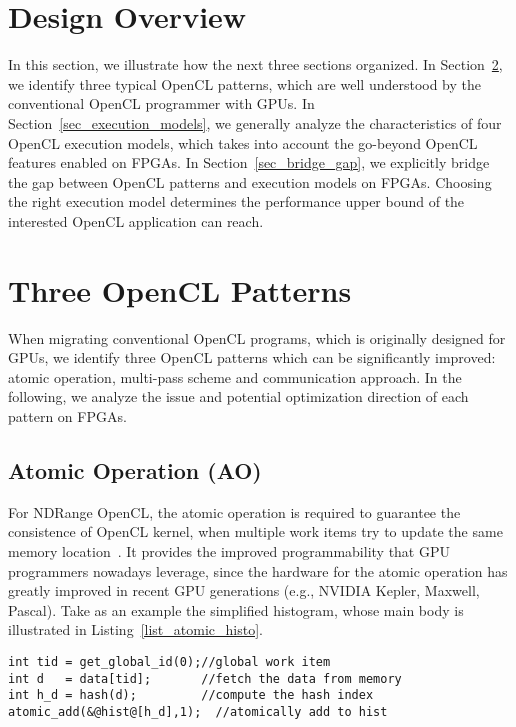 \section{Design Overview}
In this section, we illustrate how the next three sections organized. 
In Section~\ref{sec_patterns}, we identify three typical OpenCL patterns, which are well understood by the conventional OpenCL programmer with GPUs.
In Section~\ref{sec_execution_models}, we generally analyze the characteristics of four OpenCL execution models, which takes into account the go-beyond OpenCL features enabled on FPGAs.
In Section~\ref{sec_bridge_gap}, we explicitly bridge the gap between OpenCL patterns and execution models on FPGAs. Choosing the right execution model determines the performance upper bound of the interested OpenCL application can reach. %
\vspace{-1ex}
\section{Three OpenCL Patterns}%
\label{sec_patterns}
When migrating conventional OpenCL programs, which is originally designed for GPUs, we identify three OpenCL patterns which can be significantly improved: atomic operation, multi-pass scheme and communication approach. In the following, we analyze the issue and potential optimization direction of each pattern on FPGAs.

\vspace{-1ex}
\subsection{Atomic Operation (AO)}
For NDRange OpenCL, the atomic operation is required to guarantee the consistence of OpenCL kernel, when multiple work items try to update the same memory location~\cite{opencl_spec, atomic_fpga16}. It provides the improved programmability that GPU programmers nowadays leverage, since the hardware for the atomic operation has greatly improved in recent GPU generations (e.g., NVIDIA Kepler, Maxwell, Pascal).
Take as an example the simplified histogram, whose main body is illustrated in Listing~\ref{list_atomic_histo}. %

\begin{lstlisting}[caption={Atomic-based histogram},label={list_atomic_histo},captionpos=b]
int tid = get_global_id(0);//global work item
int d   = data[tid];       //fetch the data from memory
int h_d = hash(d);         //compute the hash index
atomic_add(&@hist@[h_d],1);  //atomically add to hist
\end{lstlisting}

